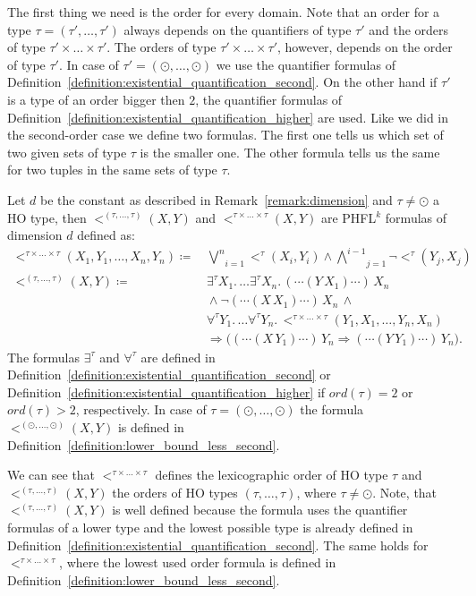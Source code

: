 The first thing we need is the order for every domain. Note that an order for a type $\tau = (\tau', \dots, \tau')$ always
depends on the quantifiers of type $\tau'$ and the orders of type $\tau' \times \dots \times \tau'$. The orders of type $\tau' \times \dots \times \tau'$, however, depends on the order of type $\tau'$. In case of $\tau' = (\odot, \dots, \odot)$ we use the quantifier formulas of Definition~\ref{definition:existential_quantification_second}. On the other hand if $\tau'$ is a type of an order bigger then $2$, the quantifier formulas of Definition~\ref{definition:existential_quantification_higher} are used. Like we did in the second-order case we define two formulas. The first
one tells us which set of two given sets of type $\tau$ is the smaller one. The other formula tells us the same for two
tuples in the same sets of type $\tau$.

\begin{definition}
    \label{definition:lower_bound_less_higher}
    Let $d$ be the constant as described in Remark~\ref{remark:dimension} and $\tau \neq \odot$ a HO
    type, then $<^{(\tau, \dots, \tau)}(X, Y)$ and $<^{\tau \times \dots \times \tau}(X, Y)$ are PHFL$^k$ formulas
    of dimension $d$ defined as:
    \begin{align*}
        <^{\tau \times \dots \times \tau}(X_1, Y_1, \dots, X_n, Y_n) \coloneqq &\,\underset{i =
        1}{\overset{n}{\bigvee}}<^{\tau}(X_i, Y_i) \wedge \underset{j = 1}{\overset{i - 1}{\bigwedge}}
        \neg <^{\tau}(Y_j, X_j)\\
        <^{(\tau, \dots, \tau)}(X, Y) \coloneqq &\,\exists^{\tau}X_1. \,\dots \exists^{\tau}X_n.\,(\dotsb(Y\,X_1)\dotsb)\,X_n\\
        &\,\wedge \neg (\dotsb(X\,X_1) \dotsb)\,X_n\,\wedge \\&\,\forall^{\tau}Y_1. \,\dots
        \forall^{\tau}Y_n.\,<^{\tau \times \dots \times \tau}
        (Y_1, X_1, \dots, Y_n, X_n) \\&\,\Rightarrow \big((\dotsb(X\,Y_1) \dotsb)\,Y_n \Rightarrow (\dotsb(Y\,Y_1)
         \dotsb)\,Y_n\big).
    \end{align*}
    The formulas $\exists^\tau$ and $\forall^\tau$ are defined in Definition~\ref{definition:existential_quantification_second} or Definition~\ref{definition:existential_quantification_higher} if $ord(\tau) = 2$ or $ord(\tau) > 2$, respectively. In case of $\tau = (\odot, \dots, \odot)$ the formula $<^{(\odot, \dots, \odot)}(X, Y)$ is defined in Definition~\ref{definition:lower_bound_less_second}.
\end{definition}
We can see that $<^{\tau \times \dots \times \tau}$ defines the lexicographic order of HO type $\tau$ and $<^{(\tau, \dots, \tau)}(X, Y)$ the orders of HO types $(\tau, \dots, \tau)$, where $\tau \neq \odot$. Note, that $<^{(\tau, \dots, \tau)}(X, Y)$ is well defined because the formula uses the quantifier formulas of a lower type and the lowest possible type is already defined in Definition~\ref{definition:existential_quantification_second}. The same holds for $<^{\tau \times \dots \times \tau}$, where the lowest used order formula is defined in Definition~\ref{definition:lower_bound_less_second}. 

